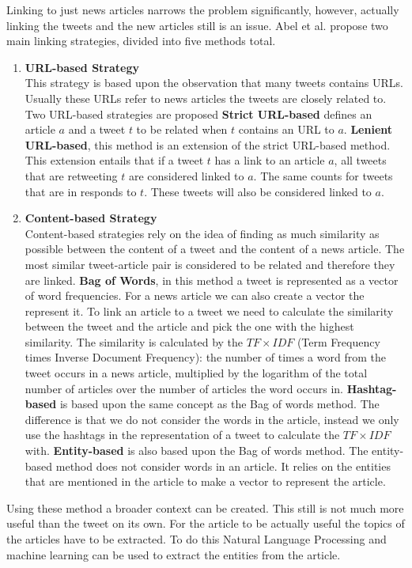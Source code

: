 \documentclass{article}
\begin{document}
Linking to just news articles narrows the problem significantly, however, actually linking the tweets and the new articles still is an issue. Abel et al. propose two main linking strategies, divided into five methods total.
\begin{enumerate}
\item \textbf{URL-based Strategy}\\
This strategy is based upon the observation that many tweets contains URLs. Usually these URLs refer to news articles the tweets are closely related to. Two URL-based strategies are proposed
	\subitem \textbf{Strict URL-based} defines an article $a$ and a tweet $t$ to be related when $t$ contains an URL to $a$.
	\subitem \textbf{Lenient URL-based}, this method is an extension of the strict URL-based method. This extension entails that if a tweet $t$ has a link to an article $a$, all tweets that are retweeting $t$ are considered linked to $a$. The same counts for tweets that are in responds to $t$. These tweets will also be considered linked to $a$.
\item \textbf{Content-based Strategy}\\
Content-based strategies rely on the idea of finding as much similarity as possible between the content of a tweet and the content of a news article. The most similar tweet-article pair is considered to be related and therefore they are linked.
	\subitem \textbf{Bag of Words}, in this method a tweet is represented as a vector of word frequencies. For a news article we can also create a vector the represent it. To link an article to a tweet we need to calculate the similarity between the tweet and the article and pick the one with the highest similarity. The similarity is calculated by the $TF \times IDF$ (Term Frequency times Inverse Document Frequency): the number of times a word from the tweet occurs in a news article, multiplied by the logarithm of the total number of articles over the number of articles the word occurs in. \cite{tfidf}
	\subitem \textbf{Hashtag-based} is based upon the same concept as the Bag of words method. The difference is that we do not consider the words in the article, instead we only use the hashtags in the representation of a tweet to calculate the $TF \times IDF$ with.
	\subitem \textbf{Entity-based} is also based upon the Bag of words method. The entity-based method does not consider words in an article. It relies on the entities that are mentioned in the article to make a vector to represent the article. 
\end{enumerate}
Using these method a broader context can be created. This still is not much more useful than the tweet on its own. For the article to be actually useful the topics of the articles have to be extracted. To do this Natural Language Processing and machine learning can be used to extract the entities from the article.  
\end{document}
